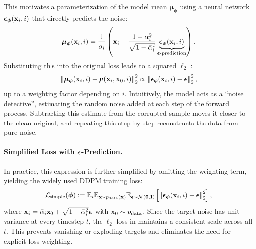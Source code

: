 This motivates a parameterization of the model mean $\bm{\mu}_{\bm{\phi}}$ using a neural network $\boldsymbol{\epsilon}_{\bm{\phi}}({\mathbf{x}}_i, i)$ that directly predicts the noise:
\[
\bm{\mu}_{\bm{\phi}}({\mathbf{x}}_i, i) = \frac{1}{\alpha_i} \left( {\mathbf{x}}_i - \frac{1 - \alpha_i^2}{\sqrt{1 - \bar{\alpha}_i^2}} \underbrace{\boldsymbol{\epsilon}_{\bm{\phi}}({\mathbf{x}}_i, i)}_{{\bm{\epsilon}}\text{-prediction}} \right).
\]
Substituting this into the original loss leads to a squared $\ell_2$ :
\[
\left\| \bm{\mu}_{\bm{\phi}}({\mathbf{x}}_i, i) - \bm{\mu}({\mathbf{x}}_i, {\mathbf{x}}_0, i) \right\|_2^2 \propto \left\| \boldsymbol{\epsilon}_{\bm{\phi}}({\mathbf{x}}_i, i) - \boldsymbol{\epsilon} \right\|_2^2,
\]
up to a weighting factor depending on $i$. Intuitively, the model acts as a ``noise detective'', estimating the random noise added at each step of the forward process. Subtracting this estimate from the corrupted sample moves it closer to the clean original, and repeating this step-by-step reconstructs the data from pure noise.

\paragraph{Simplified Loss with ${\bm{\epsilon}}$-Prediction.}
In practice, this expression is further simplified by omitting the weighting term, yielding the widely used DDPM training loss:
\begin{equation}\label{eq:ddpm-simple-loss}
    \mathcal{L}_{\text{simple}}(\bm{\phi}) := \mathbb{E}_{i} \mathbb{E}_{{\mathbf{x}} \sim p_{\text{data}}({\mathbf{x}})} \mathbb{E}_{\boldsymbol{\epsilon} \sim \mathcal{N}(\mathbf{0}, \mathbf{I})} \left[ \left\| \boldsymbol{\epsilon}_{\bm{\phi}}({\mathbf{x}}_i, i) - \boldsymbol{\epsilon} \right\|_2^2 \right],
\end{equation}
where ${\mathbf{x}}_i = \bar{\alpha}_i {\mathbf{x}}_0 + \sqrt{1 - \bar{\alpha}_i^2} \boldsymbol{\epsilon}$ with ${\mathbf{x}}_0 \sim p_{\text{data}}$. Since the target noise has unit variance at every timestep $t$, the $\ell_2$ loss in  maintains a consistent scale across all $t$. This prevents vanishing or exploding targets and eliminates the need for explicit loss weighting.

